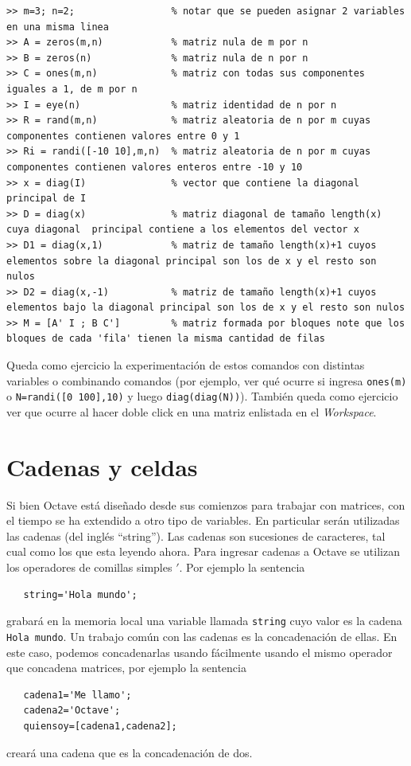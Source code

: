 \documentclass[letter,11pt]{article}
\newcommand\0{\mathbf{0}}
\newcommand{\octave}{{\sc Octave }}
\begin{document}
\begin{lstlisting}
>> m=3; n=2;                 % notar que se pueden asignar 2 variables en una misma linea
>> A = zeros(m,n)            % matriz nula de m por n
>> B = zeros(n)              % matriz nula de n por n
>> C = ones(m,n)             % matriz con todas sus componentes  iguales a 1, de m por n
>> I = eye(n)                % matriz identidad de n por n
>> R = rand(m,n)             % matriz aleatoria de n por m cuyas componentes contienen valores entre 0 y 1                                    
>> Ri = randi([-10 10],m,n)  % matriz aleatoria de n por m cuyas componentes contienen valores enteros entre -10 y 10
>> x = diag(I)               % vector que contiene la diagonal principal de I
>> D = diag(x)               % matriz diagonal de tamaño length(x) cuya diagonal  principal contiene a los elementos del vector x
>> D1 = diag(x,1)            % matriz de tamaño length(x)+1 cuyos elementos sobre la diagonal principal son los de x y el resto son nulos
>> D2 = diag(x,-1)           % matriz de tamaño length(x)+1 cuyos elementos bajo la diagonal principal son los de x y el resto son nulos
>> M = [A' I ; B C']         % matriz formada por bloques note que los bloques de cada 'fila' tienen la misma cantidad de filas
\end{lstlisting}

\medskip

Queda como ejercicio la experimentaci\'on de estos comandos con distintas variables o combinando comandos (por ejemplo, ver qu\'e ocurre si ingresa \verb"ones(m)" o \verb"N=randi([0 100],10)" y luego \verb"diag(diag(N))"). Tambi\'en queda como ejercicio ver que ocurre al hacer doble click en una matriz enlistada en el \emph{Workspace}. 

\section{Cadenas y celdas}
  Si bien \octave est\'a dise\~{n}ado desde sus comienzos para trabajar con matrices, con el tiempo se ha extendido a otro tipo de variables. En particular ser\'an utilizadas las cadenas (del ingl\'es ``string''). Las cadenas son sucesiones de caracteres, tal cual como los que esta leyendo ahora. Para ingresar cadenas a \octave se utilizan los operadores de comillas simples $'$. Por ejemplo la sentencia
  \begin{lstlisting}
   string='Hola mundo';
  \end{lstlisting}
  grabar\'a en la memoria local una variable llamada \texttt{string} cuyo valor es la cadena \texttt{Hola mundo}. Un trabajo com\'un con las cadenas es la concadenaci\'on de ellas. En este caso, podemos concadenarlas usando f\'acilmente usando el mismo operador que concadena matrices, por ejemplo la sentencia
  \begin{lstlisting}
   cadena1='Me llamo';
   cadena2='Octave';
   quiensoy=[cadena1,cadena2];
  \end{lstlisting}
  crear\'a una cadena que es la concadenaci\'on de dos.
  
\end{document}

